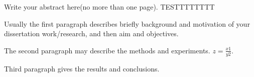 

Write your abstract here(no more than one page). TESTTTTTTTT

Usually the first paragraph describes briefly background and
motivation of your dissertation work/research, and then aim and
objectives.

\smallskip
The second paragraph may describe the methods and experiments.
$ z = \frac{x1}{y2}$.

\smallskip
Third paragraph gives the results and conclusions.


